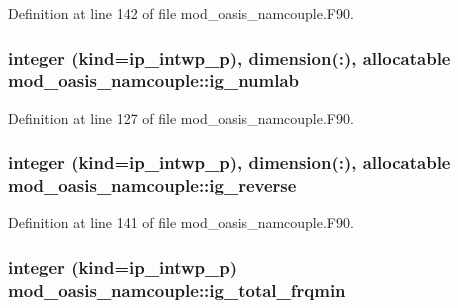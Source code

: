 Definition at line 142 of file mod\+\_\+oasis\+\_\+namcouple.\+F90.

\hypertarget{classmod__oasis__namcouple_ab0b9a7822ec44010e8652ed2d6abc0db}{
\subsubsection[{ig\+\_\+numlab}]{\setlength{\rightskip}{0pt plus 5cm}integer (kind=ip\+\_\+intwp\+\_\+p), dimension(\+:), allocatable mod\+\_\+oasis\+\_\+namcouple\+::ig\+\_\+numlab\hspace{0.3cm}{\ttfamily [private]}}}\label{classmod__oasis__namcouple_ab0b9a7822ec44010e8652ed2d6abc0db}


Definition at line 127 of file mod\+\_\+oasis\+\_\+namcouple.\+F90.

\hypertarget{classmod__oasis__namcouple_adc4dcf30da2b88fb1798dd02e7833bc1}{
\subsubsection[{ig\+\_\+reverse}]{\setlength{\rightskip}{0pt plus 5cm}integer (kind=ip\+\_\+intwp\+\_\+p), dimension(\+:), allocatable mod\+\_\+oasis\+\_\+namcouple\+::ig\+\_\+reverse\hspace{0.3cm}{\ttfamily [private]}}}\label{classmod__oasis__namcouple_adc4dcf30da2b88fb1798dd02e7833bc1}


Definition at line 141 of file mod\+\_\+oasis\+\_\+namcouple.\+F90.

\hypertarget{classmod__oasis__namcouple_a839912711f8d2f44a825689e2673d0dd}{
\subsubsection[{ig\+\_\+total\+\_\+frqmin}]{\setlength{\rightskip}{0pt plus 5cm}integer (kind=ip\+\_\+intwp\+\_\+p) mod\+\_\+oasis\+\_\+namcouple\+::ig\+\_\+total\+\_\+frqmin\hspace{0.3cm}{\ttfamily [private]}}}\label{classmod__oasis__namcouple_a839912711f8d2f44a825689e2673d0dd}


